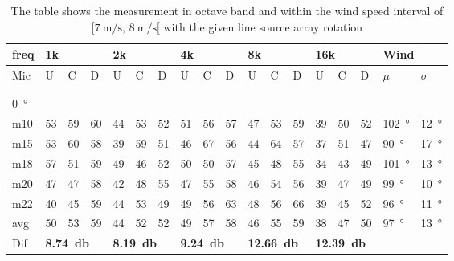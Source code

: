 \begin{table}[H]
\centering
\caption{The table shows the measurement in octave band and within the wind speed interval of $[\SI{7}{\meter\per\second},\, \SI{8}{\meter\per\second}[ $ with the given line source array rotation}
\setlength\tabcolsep{5pt} %
\begin{tabular}{l|l|l|l|l|l|l|l|l|l|l|l|l|l|l|l|l|l}
freq & \multicolumn{3}{l|}{1k} & \multicolumn{3}{l|}{2k} & \multicolumn{3}{l|}{4k} & \multicolumn{3}{l|}{8k} & \multicolumn{3}{l|}{16k}   &  \multicolumn{2}{l}{Wind}                      \\ \hline
Mic  & U      & C      & D     & U      & C      & D     & U      & C      & D     & U      & C      & D     & U  & C  & D & $\mu$ & $\sigma$ \\ \hline
 & \multicolumn{3}{l|}{} & \multicolumn{3}{l|}{} & \multicolumn{3}{l|}{} & \multicolumn{3}{l|}{} & \multicolumn{3}{l|}{} &      \multicolumn{2}{l}{}                        \\ 
 \multicolumn{18}{l}{ } \\  
\SI{0}{\degree}   & \multicolumn{3}{l|}{} & \multicolumn{3}{l|}{} & \multicolumn{3}{l|}{} & \multicolumn{3}{l|}{} & \multicolumn{3}{l|}{} &  \multicolumn{2}{l}{}   \\  \hline
m10  & 53     & 59     & 60    & 44     & 53     & 52    & 51     & 56     & 57    & 47     & 53     & 59    & 39 & 50 & 52 & \SI{102}{\degree} & \SI{12}{\degree}  \\
m15  & 53     & 60     & 58    & 39     & 59     & 51    & 46     & 67     & 56    & 44     & 64     & 57    & 37 & 51 & 47 & \SI{90}{\degree} & \SI{17}{\degree}  \\
m18  & 57     & 51     & 59    & 49     & 46     & 52    & 50     & 50     & 57    & 45     & 48     & 55    & 34 & 43 & 49 & \SI{101}{\degree} & \SI{13}{\degree}  \\
m20  & 47     & 47     & 58    & 42     & 48     & 55    & 47     & 55     & 58    & 46     & 54     & 56    & 39 & 47 & 49 & \SI{99}{\degree} & \SI{10}{\degree}  \\
m22  & 40     & 45     & 59    & 44     & 53     & 49    & 49     & 56     & 63    & 48     & 56     & 66    & 39 & 45 & 52 & \SI{96}{\degree} & \SI{11}{\degree}  \\ \hline
avg  &  50     &  53   &  59    &  44    & 52     & 52    &  49    &  57    &  58   &  46    &  55    & 59    & 38   & 47   &  50  & \SI{97}{\degree} & \SI{13}{\degree} \\ \hline  
Dif & \multicolumn{3}{l|}{\textbf{\SI{8.74}{\decibel}}} & \multicolumn{3}{l|}{\textbf{\SI{8.19}{\decibel}}} & \multicolumn{3}{l|}{\textbf{\SI{9.24}{\decibel}}} & \multicolumn{3}{l|}{\textbf{\SI{12.66}{\decibel}}} &  \multicolumn{3}{l|}{\textbf{\SI{12.39}{\decibel}}} &  \multicolumn{2}{l}{}  \\ \hline 

\end{tabular}
\end{table}
